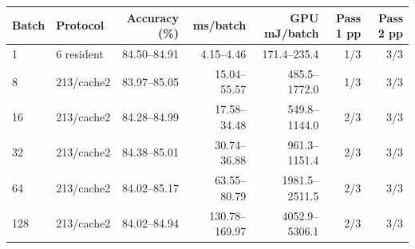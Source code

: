 \begin{tabular}{@{}llrrrrr@{}}
\toprule
Batch & Protocol & Accuracy (\%) & ms/batch & GPU mJ/batch & Pass 1 pp & Pass 2 pp\\
\midrule
1 & 6 resident & 84.50--84.91 & 4.15--4.46 & 171.4--235.4 & 1/3 & 3/3\\
8 & 213/cache2 & 83.97--85.05 & 15.04--55.57 & 485.5--1772.0 & 1/3 & 3/3\\
16 & 213/cache2 & 84.28--84.99 & 17.58--34.48 & 549.8--1144.0 & 2/3 & 3/3\\
32 & 213/cache2 & 84.38--85.01 & 30.74--36.88 & 961.3--1151.4 & 2/3 & 3/3\\
64 & 213/cache2 & 84.02--85.17 & 63.55--80.79 & 1981.5--2511.5 & 2/3 & 3/3\\
128 & 213/cache2 & 84.02--84.94 & 130.78--169.97 & 4052.9--5306.1 & 2/3 & 3/3\\
\bottomrule
\end{tabular}